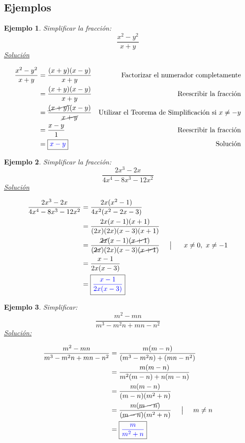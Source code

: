 \documentclass[A4paper, 10pt, oneside]{book}
\newtheorem{example}{Ejemplo}[chapter]
\begin{document}
	\subsection*{Ejemplos}
	
		\begin{example}
			Simplificar la fracción: $$\frac{x^2-y^2}{x+y}$$
			\underline{Solución}
			
			\begin{align*}
				\frac{x^2-y^2}{x+y} & = \frac{(x+y)(x-y)}{x+y} & \text{Factorizar el numerador completamente}\\
				&=\frac{(x+y)(x-y)}{x+y}  & \text{Reescribir la fracción}\\
				&=\frac{\cancel{(x+y)}(x-y)}{\cancel{x+y}} & \text{Utilizar el Teorema de Simplificación si $x\neq -y$}\\
				&=\frac{x-y}{1}  & \text{Reescribir la fracción}\\
				&= \fbox{\color{blue}{$x-y$}} & \text{Solución}
			\end{align*}
		\end{example}
	
		\begin{example}
			Simplificar la fracción: $$\frac{2x^3-2x}{4x^4-8x^3-12x^2}$$
			\underline{Solución}
			
			\begin{align*}
				\frac{2x^3-2x}{4x^4-8x^3-12x^2} & = \frac{2x(x^2-1)}{4x^2(x^2-2x-3)}\\
				& = \frac{2x(x-1)(x+1)}{(2x)(2x)(x-3)(x+1)}\\
				&=\frac{\cancel{2x}(x-1)(\cancel{x+1})}{(\cancel{2x})(2x)(x-3)(\cancel{x+1})} \hspace{5mm} \big| \ \hspace{5mm} x\neq 0, \ x\neq -1\\
				&= \frac{x-1}{2x(x-3)}\\
				&= \fbox{\color{blue}{$\displaystyle{\frac{x-1}{2x(x-3)}}$}}
			\end{align*}
		\end{example}
	
		\begin{example}
			Simplificar: $$\frac{m^2-mn}{m^3-m^2n+mn-n^2}$$
			\underline{Solución:}
			
			\begin{align*}
				\frac{m^2-mn}{m^3-m^2n+mn-n^2} &= \frac{m(m-n)}{(m^3-m^2n)+(mn-n^2)}\\
				&=\frac{m(m-n)}{m^2(m-n)+n(m-n)}\\
				&=\frac{m(m-n)}{(m-n)(m^2+n)}\\
				&=\frac{m(\cancel{m-n})}{(\cancel{m-n})(m^2+n)} \hspace{5mm} \big| \hspace{5mm} m\neq n\\
				&= \fbox{\color{blue}{$\displaystyle{\frac{m}{m^2+n}}$}}
			\end{align*}
		\end{example}
	
\end{document}
